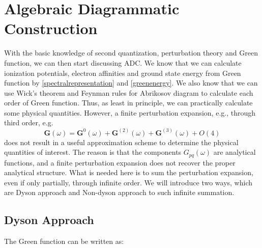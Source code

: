 \section{Algebraic Diagrammatic Construction}
With the basic knowledge of second quantization, perturbation theory and Green function, we can then start discussing ADC.
We know that we can calculate ionization potentials, electron affinities and ground state energy from Green function by \ref{spectralrepresentation} and \ref{greenenergy}.
We also know that we can use Wick's theorem and Feynman rules for Abrikosov diagram to calculate each order of Green function.
Thus, as least in principle, we can practically calculate some physical quantities.
However, a finite perturbation expansion, e.g., through third order, e.g.
\begin{equation}
\boldsymbol{G}(\omega)=\boldsymbol{G}^{0}(\omega)+\boldsymbol{G}^{(2)}(\omega)+\boldsymbol{G}^{(3)}(\omega)+O(4)
\end{equation}
does not result in a useful approximation scheme to determine the physical quantities of interest.
The reason is that the components $G_{pq}(ω)$ are analytical functions, and a finite perturbation expansion does not recover the proper analytical structure.
What is needed here is to sum the perturbation expansion, even if only partially, through infinite order.
We will introduce two ways, which are Dyson approach and Non-dyson approach to such infinite summation.

\subsection{Dyson Approach}
The Green function can be written as:

